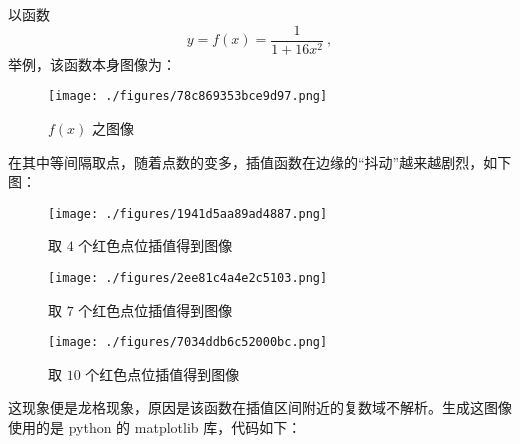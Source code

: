 以函数
$$y = f(x) = \frac1{1+16 x^2} ~,$$
举例，该函数本身图像为：
\begin{figure}[ht]
\centering
\texttt{[image: ./figures/78c869353bce9d97.png]}
\caption{$f(x)$ 之图像} \label{fig_PolyIP_1}
\end{figure}
在其中等间隔取点，随着点数的变多，插值函数在边缘的“抖动”越来越剧烈，如下图：
\begin{figure}[ht]
\centering
\texttt{[image: ./figures/1941d5aa89ad4887.png]}
\caption{取 $4$ 个红色点位插值得到图像} \label{fig_PolyIP_2}
\end{figure}
\begin{figure}[ht]
\centering
\texttt{[image: ./figures/2ee81c4a4e2c5103.png]}
\caption{取 $7$ 个红色点位插值得到图像} \label{fig_PolyIP_3}
\end{figure}
\begin{figure}[ht]
\centering
\texttt{[image: ./figures/7034ddb6c52000bc.png]}
\caption{取 $10$ 个红色点位插值得到图像} \label{fig_PolyIP_4}
\end{figure}
这现象便是龙格现象，原因是该函数在插值区间附近的复数域不解析。生成这图像使用的是 python 的 matplotlib 库，代码如下：

